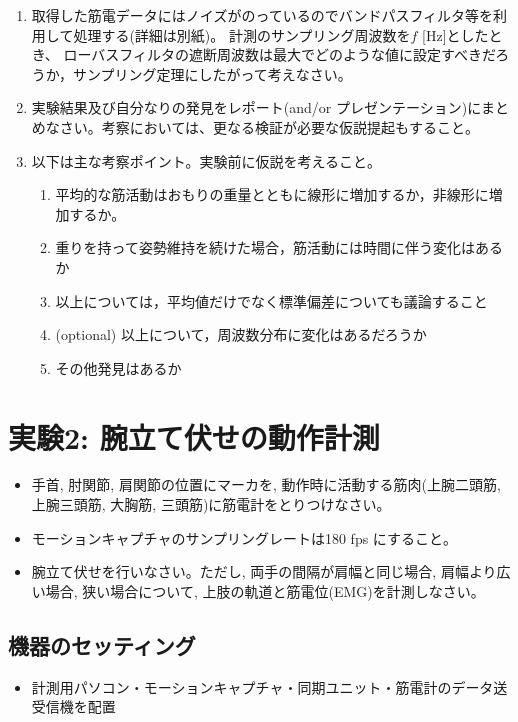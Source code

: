 \documentclass{jsarticle}
\begin{document}
\begin{enumerate}
  \item 取得した筋電データにはノイズがのっているのでバンドパスフィルタ等を利用して処理する(詳細は別紙)。
  計測のサンプリング周波数を$f$ [Hz]としたとき、
  ローバスフィルタの遮断周波数は最大でどのような値に設定すべきだろうか，サンプリング定理にしたがって考えなさい。
  \item 実験結果及び自分なりの発見をレポート(and/or プレゼンテーション)にまとめなさい。考察においては、更なる検証が必要な仮説提起もすること。
  \item 以下は主な考察ポイント。実験前に仮説を考えること。
  \begin{enumerate}
    \item 平均的な筋活動はおもりの重量とともに線形に増加するか，非線形に増加するか。
    \item 重りを持って姿勢維持を続けた場合，筋活動には時間に伴う変化はあるか
    \item 以上については，平均値だけでなく標準偏差についても議論すること
    \item (optional) 以上について，周波数分布に変化はあるだろうか
    \item その他発見はあるか
  \end{enumerate}
  
\end{enumerate}


\section{実験2: 腕立て伏せの動作計測}


\begin{itemize}
\item 手首, 肘関節, 肩関節の位置にマーカを, 動作時に活動する筋肉(上腕二頭筋, 上腕三頭筋, 大胸筋, 三頭筋)に筋電計をとりつけなさい。
\item モーションキャプチャのサンプリングレートは180 fps にすること。
\item 腕立て伏せを行いなさい。ただし, 両手の間隔が肩幅と同じ場合, 肩幅より広い場合, 狭い場合について, 上肢の軌道と筋電位(EMG)を計測しなさい。
\end{itemize}


\subsection{機器のセッティング}
\begin{itemize}
\item 計測用パソコン・モーションキャプチャ・同期ユニット・筋電計のデータ送受信機を配置
\end{itemize}
\end{document}
